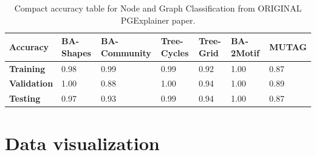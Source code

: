 \begin{table}[h]
    \centering
    \scriptsize
    \begin{tabularx}{\linewidth}{l|X X X X|X X}
    \hline
    \textbf{Accuracy} & \textbf{BA-Shapes} & \textbf{BA-Community} & \textbf{Tree-Cycles} & \textbf{Tree-Grid} & \textbf{BA-2Motif} & \textbf{MUTAG} \\
    \hline
    \textbf{Training}   & 0.98 & 0.99 & 0.99 & 0.92 & 1.00 & 0.87 \\
    \textbf{Validation} & 1.00 & 0.88 & 1.00 & 0.94 & 1.00 & 0.89 \\
    \textbf{Testing}    & 0.97 & 0.93 & 0.99 & 0.94 & 1.00 & 0.87 \\
    \hline
    \end{tabularx}
    \caption[Accuracies of original GNN downstream task]{Compact accuracy table for Node and Graph Classification from ORIGINAL PGExplainer paper.}
    \label{tab:compact-accuracy}
\end{table}


\section{Data visualization}

